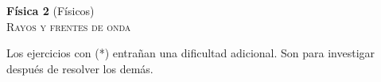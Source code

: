 \documentclass[11pt,spanish,a4paper]{article}
\begin{document}
\begin{center}
	\textbf{Física 2} (Físicos) \hfill {}\\
	\textsc{\LARGE Rayos y frentes de onda}
\end{center}

Los ejercicios con (*) entrañan una dificultad adicional. Son para investigar después de resolver los demás.


\begin{enumerate}










\end{enumerate}
\end{document}
